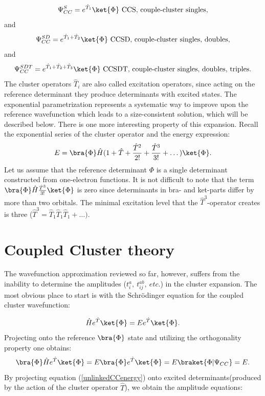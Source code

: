 \documentclass[twoside,english]{uiofysmaster}
\begin{document}
\begin{equation*}
\Psi_{CC}^{S} =  e^{\hat{T}_1}\ket{\Phi} \ \text{CCS, couple-cluster singles},
\end{equation*}
and
\begin{equation*}
\Psi_{CC}^{SD} =  e^{\hat{T}_1 + \hat{T}_2}\ket{\Phi} \ \text{CCSD, couple-cluster singles, doubles},
\end{equation*}
and
\begin{equation*}
\Psi_{CC}^{SDT} =  e^{\hat{T}_1 + \hat{T}_2 + \hat{T}_3}\ket{\Phi} \ \text{CCSDT, couple-cluster singles, doubles, triples}.
\end{equation*}
The cluster operators $\hat{T}_i$ are also called excitation
operators, since acting on the reference determinant they produce
determinants with excited states.  The exponential parametrization
represents a systematic way to improve upon the reference wavefunction
which leads to a size-consistent solution, which will be described
below.  There is one more interesting property of this
expansion. Recall the exponential series of the cluster operator and
the energy expression:
\begin{equation}
E = \bra{\Phi} \hat{H}(1 + \hat{T} + \frac{\hat{T}^2}{2!} + \frac{\hat{T}^3}{3!} + \dots) \ket{\Phi}.
\end{equation}
Let us assume that the reference determinant $\Phi$ is a single
determinant constructed from one-electron functions. It is not
difficult to note that the term $\bra{\Phi}
\hat{H}\frac{\hat{T}^3}{3!}\ket{\Phi} $ is zero since determinants in
bra- and ket-parts differ by more than two orbitals. The minimal
excitation level that the $\hat{T}^3$-operator creates is three
($\hat{T}^3 = \hat{T}_1\hat{T}_1\hat{T}_1 + \dots)$.


\section{Coupled Cluster theory}

The wavefunction approximation reviewed so far, however, suffers from
the inability to determine the amplitudes
($t_i^a,\ t_{ij}^{ab},\ etc.$) in the cluster expansion. The most
obvious place to start is with the Schr\"{o}dinger equation for the coupled cluster
wavefunction:

\begin{equation}\label{unlinkedCCenergy}
\hat{H}e^{\hat{T}}\ket{\Phi} = Ee^{\hat{T}}\ket{\Phi}.	
\end{equation}
Projecting onto the reference $\bra{\Phi}$ state and utilizing the orthogonality property one obtains:	
\begin{equation}\label{unlinkedCCamplts}
\bra{\Phi}\hat{H}e^{\hat{T}}\ket{\Phi} = E\bra{\Phi}e^{\hat{T}}\ket{\Phi} = E\braket{\Phi|\Psi_{CC}} = E.
\end{equation}		
By projecting equation (\ref{unlinkedCCenergy}) onto excited
determinants(produced by the action of the cluster operator
$\hat{T}$), we obtain the amplitude equations:
\end{document}
